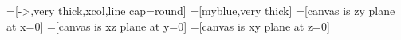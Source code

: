 \usepackage{amsmath}
\usepackage{tikz}
\usepackage{physics}
\usepackage[outline]{contour} %
\usetikzlibrary{angles,quotes} %
\usetikzlibrary{bending} %
\contourlength{1.0pt}
\usetikzlibrary{3d}

\tikzset{>=latex} %
\usepackage{xcolor}


=[->,very thick,xcol,line cap=round]
=[myblue,very thick]
=[canvas is zy plane at x=0]
=[canvas is xz plane at y=0]
=[canvas is xy plane at z=0]
\def\tick#1#2{\draw[thick] (#1) ++ (#2:0.12) --++ (#2-180:0.24)}
\def\N{100}


